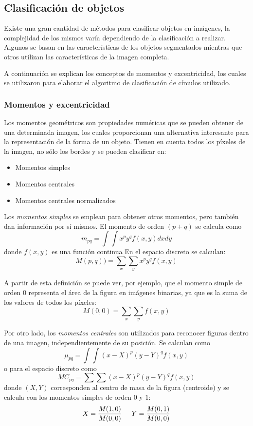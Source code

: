 \subsection{Clasificación de objetos}

Existe una gran cantidad de métodos para clasificar objetos en imágenes, la complejidad de los mismos varía dependiendo de la clasificación a realizar. Algunos se basan en las características de los objetos segmentados mientras que otros utilizan las características de la imagen completa.

A continuación se explican los conceptos de momentos y excentricidad, los cuales se utilizaron para elaborar el algoritmo de clasificación de círculos utilizado.

\subsubsection{Momentos y excentricidad \cite{imageMoments}}

Los momentos geométricos son propiedades numéricas que se pueden obtener de una determinada imagen, los cuales proporcionan una alternativa interesante para la representación de la forma de un objeto. Tienen en cuenta todos los píxeles de la imagen, no sólo los bordes y se pueden clasificar en:

\begin{itemize}
\item Momentos simples
\item Momentos centrales
\item Momentos centrales normalizados
\end{itemize}

Los \textit{momentos simples} se emplean para obtener otros momentos, pero también dan información por sí mismos. El momento de orden $(p+q)$ se calcula como $$m_{pq}={\int}{\int}x^py^qf(x,y)dxdy$$ donde $f(x,y)$ es una función continua En el espacio discreto se calculan: $$M(p,q))={\sum}_x{\sum}_yx^py^qf(x,y)$$

A partir de esta definición se puede ver, por ejemplo, que el momento simple de orden 0 representa el área de la figura en imágenes binarias, ya que es la suma de los valores de todos los píxeles: $$M(0,0) = {\sum}_x{\sum}_yf(x,y)$$

Por otro lado, los \textit{momentos centrales} son utilizados para reconocer figuras dentro de una imagen, independientemente de su posición. Se calculan como $${\mu}_{pq}={\int}{\int}(x-X)^p(y-Y)^qf(x,y)$$ o para el espacio discreto como $${MC}_{pq}={\sum}{\sum}(x-X)^p(y-Y)^qf(x,y)$$ donde $(X,Y)$ corresponden al centro de masa de la figura (centroide) y se calcula con los momentos simples de orden $0$ y $1$: $$X=\frac{M(1,0)}{M(0,0)} \hspace{5 mm} Y=\frac{M(0,1)}{M(0,0)}$$

